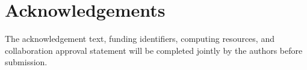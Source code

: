 \documentclass[11pt,a4paper]{article}
\begin{document}
\section*{Acknowledgements}

The acknowledgement text, funding identifiers, computing resources, and collaboration
approval statement will be completed jointly by the authors before submission.

\printbibliography
\end{document}
